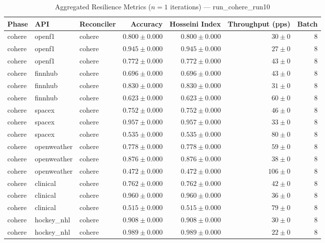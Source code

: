 
\begin{table}[htbp]
\caption{Aggregated Resilience Metrics ($n=1$ iterations) --- run_cohere_run10}
\begin{tabular}{l l l r r r r}
\hline
Phase & API & Reconciler & Accuracy & Hosseini Index & Throughput (pps) & Batch \\
\hline
cohere & openf1 & cohere & $0.800\pm0.000$ & $0.800\pm0.000$ & $30\pm0$ & 8 \\
cohere & openf1 & cohere & $0.945\pm0.000$ & $0.945\pm0.000$ & $27\pm0$ & 8 \\
cohere & openf1 & cohere & $0.772\pm0.000$ & $0.772\pm0.000$ & $43\pm0$ & 8 \\
cohere & finnhub & cohere & $0.696\pm0.000$ & $0.696\pm0.000$ & $43\pm0$ & 8 \\
cohere & finnhub & cohere & $0.830\pm0.000$ & $0.830\pm0.000$ & $31\pm0$ & 8 \\
cohere & finnhub & cohere & $0.623\pm0.000$ & $0.623\pm0.000$ & $60\pm0$ & 8 \\
cohere & spacex & cohere & $0.752\pm0.000$ & $0.752\pm0.000$ & $46\pm0$ & 8 \\
cohere & spacex & cohere & $0.957\pm0.000$ & $0.957\pm0.000$ & $33\pm0$ & 8 \\
cohere & spacex & cohere & $0.535\pm0.000$ & $0.535\pm0.000$ & $80\pm0$ & 8 \\
cohere & openweather & cohere & $0.778\pm0.000$ & $0.778\pm0.000$ & $59\pm0$ & 8 \\
cohere & openweather & cohere & $0.876\pm0.000$ & $0.876\pm0.000$ & $38\pm0$ & 8 \\
cohere & openweather & cohere & $0.472\pm0.000$ & $0.472\pm0.000$ & $106\pm0$ & 8 \\
cohere & clinical & cohere & $0.762\pm0.000$ & $0.762\pm0.000$ & $42\pm0$ & 8 \\
cohere & clinical & cohere & $0.960\pm0.000$ & $0.960\pm0.000$ & $36\pm0$ & 8 \\
cohere & clinical & cohere & $0.515\pm0.000$ & $0.515\pm0.000$ & $79\pm0$ & 8 \\
cohere & hockey\_nhl & cohere & $0.908\pm0.000$ & $0.908\pm0.000$ & $30\pm0$ & 8 \\
cohere & hockey\_nhl & cohere & $0.989\pm0.000$ & $0.989\pm0.000$ & $22\pm0$ & 8 \\

\end{tabular}
\end{table}
